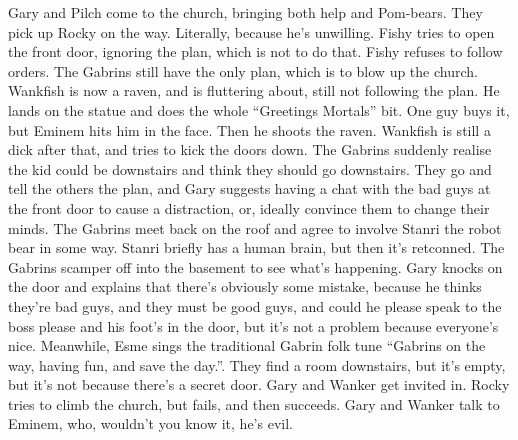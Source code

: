 Gary and Pilch come to the church, bringing both help and Pom-bears. They pick up Rocky on the way. Literally, because he’s unwilling.\medskip
Fishy tries to open the front door, ignoring the plan, which is not to do that.\medskip
Fishy refuses to follow orders. The Gabrins still have the only plan, which is to blow up the church.\medskip
Wankfish is now a raven, and is fluttering about, still not following the plan.\medskip
He lands on the statue and does the whole “Greetings Mortals” bit.\medskip
One guy buys it, but Eminem hits him in the face. Then he shoots the raven.\medskip
Wankfish is still a dick after that, and tries to kick the doors down.\medskip
The Gabrins suddenly realise the kid could be downstairs and think they should go downstairs. They go and tell the others the plan, and Gary suggests having a chat with the bad guys at the front door to cause a distraction, or, ideally convince them to change their minds.\medskip
The Gabrins meet back on the roof and agree to involve Stanri the robot bear in some way.\medskip
Stanri briefly has a human brain, but then it’s retconned.\medskip
The Gabrins scamper off into the basement to see what’s happening.\medskip
Gary knocks on the door and explains that there’s obviously some mistake, because he thinks they’re bad guys, and they must be good guys, and could he please speak to the boss please and his foot’s in the door, but it’s not a problem because everyone’s nice.\medskip
Meanwhile, Esme sings the traditional Gabrin folk tune “Gabrins on the way, having fun, and save the day.”.\medskip
They find a room downstairs, but it’s empty, but it’s not because there’s a secret door.\medskip
Gary and Wanker get invited in. Rocky tries to climb the church, but fails, and then succeeds.\medskip
Gary and Wanker talk to Eminem, who, wouldn’t you know it, he’s evil.